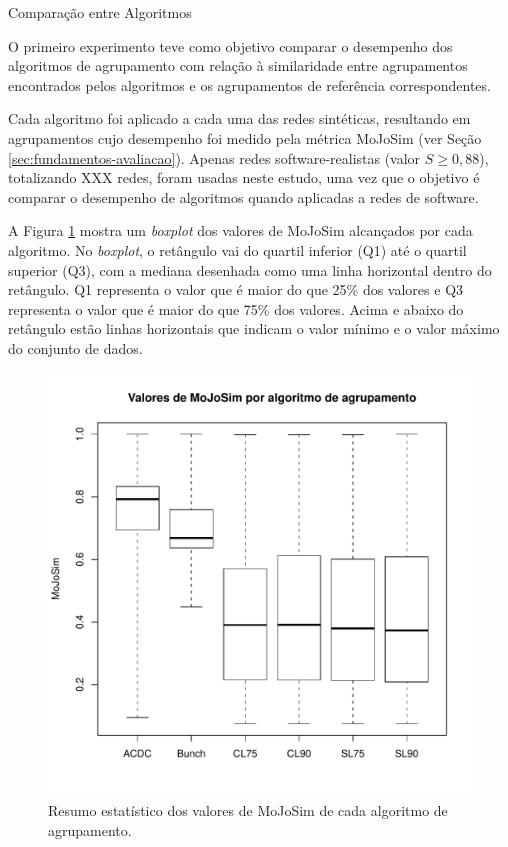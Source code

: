 \begin{section}{Comparação entre Algoritmos}

O primeiro experimento teve como objetivo comparar o desempenho dos algoritmos de agrupamento com relação à similaridade entre agrupamentos encontrados pelos algoritmos e os agrupamentos de referência correspondentes.

Cada algoritmo foi aplicado a cada uma das redes sintéticas, resultando em agrupamentos cujo desempenho foi medido pela métrica MoJoSim (ver Seção \ref{sec:fundamentos-avaliacao}). Apenas redes software-realistas (valor $S \ge 0,88$), totalizando XXX redes, foram usadas neste estudo, uma vez que o objetivo é comparar o desempenho de algoritmos quando aplicadas a redes de software.

A Figura \ref{fig:box-mojo-por-alg} mostra um \emph{boxplot} dos valores de MoJoSim alcançados por cada algoritmo. No \emph{boxplot}, o retângulo vai do quartil inferior (Q1) até o quartil superior (Q3), com a mediana desenhada como uma linha horizontal dentro do retângulo. Q1 representa o valor que é maior do que 25\% dos valores e Q3 representa o valor que é maior do que 75\% dos valores. Acima e abaixo do retângulo estão linhas horizontais que indicam o valor mínimo e o valor máximo do conjunto de dados. %

\begin{figure}[htbp]
	\centering
		\includegraphics[scale=0.5]{figuras/box-mojo-por-alg}
	\caption{Resumo estatístico dos valores de MoJoSim de cada algoritmo de agrupamento.}
	\label{fig:box-mojo-por-alg}
\end{figure}



\end{section}
